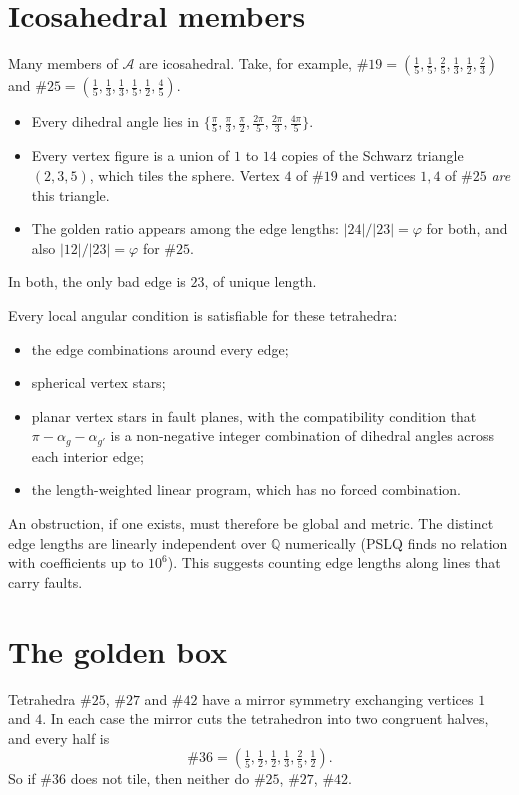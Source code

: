 \documentclass[11pt]{amsart}
\theoremstyle{definition}
\newcommand{\cA}{\mathscr{A}}
\newcommand{\Q}{\mathbb{Q}}
\begin{document}
\section{Icosahedral members}
Many members of $\cA$ are icosahedral. Take, for example, $\#19=(\frac15,\frac15,\frac25,\frac13,\frac12,\frac23)$ and
$\#25=(\frac15,\frac13,\frac13,\frac15,\frac12,\frac45)$.
\begin{itemize}[leftmargin=1.5em]
\item Every dihedral angle lies in $\{\frac\pi5,\frac\pi3,\frac\pi2,\frac{2\pi}5,\frac{2\pi}3,\frac{4\pi}5\}$.
\item Every vertex figure is a union of $1$ to $14$ copies of the Schwarz triangle $(2,3,5)$, which tiles the sphere.
Vertex $4$ of $\#19$ and vertices $1,4$ of $\#25$ \emph{are} this triangle.
\item The golden ratio appears among the edge lengths: $|24|/|23|=\varphi$ for both, and also $|12|/|23|=\varphi$ for
$\#25$.
\end{itemize}
In both, the only bad edge is $23$, of unique length.

Every local angular condition is satisfiable for these tetrahedra:
\begin{itemize}[leftmargin=1.5em]
\item the edge combinations around every edge;
\item spherical vertex stars;
\item planar vertex stars in fault planes, with the compatibility condition that $\pi-\alpha_g-\alpha_{g'}$ is a
non-negative integer combination of dihedral angles across each interior edge;
\item the length-weighted linear program, which has no forced combination.
\end{itemize}
An obstruction, if one exists, must therefore be global and metric. The distinct edge lengths are linearly independent
over $\Q$ numerically (PSLQ finds no relation with coefficients up to $10^6$). This suggests counting edge lengths along
lines that carry faults.

\section{The golden box}\label{sec:golden}
Tetrahedra $\#25$, $\#27$ and $\#42$ have a mirror symmetry exchanging vertices $1$ and $4$. In each case the mirror cuts
the tetrahedron into two congruent halves, and every half is
\[\#36=(\tfrac15,\tfrac12,\tfrac12,\tfrac13,\tfrac25,\tfrac12).\]
So if $\#36$ does not tile, then neither do $\#25$, $\#27$, $\#42$.
\end{document}
